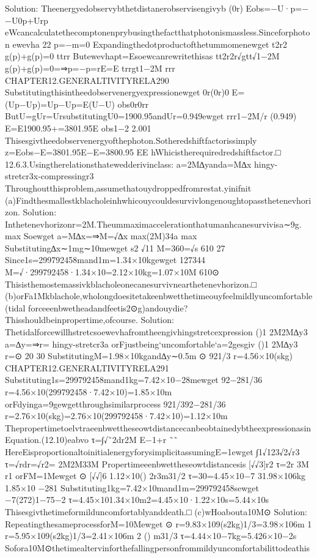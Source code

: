 {{{{{{{{{{{{{{{{Solution:
Theenergyedobservybthetdistanerobservisengivyb
(0r)
Eobs=−U·p=−−U0p+Urp
eWcancalculatethecomptonenprybusingthefactthatphotonismassless.Sinceforphoton
ewevha
22
p=−m=0
Expandingthedotproductofthetummomenewget
t2r2
g(p)+g(p)=0
ttrr
Butewevhapt=Esoewcanrewritethisas
tt2r2r√gtt√1−2M
g(p)+g(p)=0=⇒p=−p=rE=E
trrgt1−2M
rrr
CHAPTER12.GENERALTIVITYRELA290
Substitutingthisintheedobservenergyexpressionewget
0r(0r)0
E=(Up−Up)=Up−Up=E(U−U)
obs0r0rr
ButU=gUr=UrsubstitutingU0=1900.95andUr=0.949ewget
rrr1−2M/r
(0.949)
E=E1900.95+=3801.95E
obs1−2
2.001
Thisesgivtheedobservenergyofthephoton.Sotheredshiftfactorissimply
z=Eobs−E=3801.95E−E=3800.95
EE
hWhicistherequiredredshiftfactor.□
12.6.3.Usingtherelationsthatewedderivinclass:
a=2M∆yanda=M∆x
hingy-stretcr3x-compressingr3
Throughoutthisproblem,assumethatouydroppedfromrestat.yinifnit
(a)Findthesmallestkblacholeinhwhicouycouldesurvivlongenoughtopassthetenevhorizon.
Solution:
Inthetenevhorizonr=2M.Theummaximaccelerationthatumanhcanesurvivisa∼9g.
max
Soewget
a=M∆x=⇒M=√∆x
max(2M)34a
max
Substituting∆x∼1mg∼10mewget
s2
√11
M=360=√s
610
27
Since1s=299792458mand1m=1.34×10kgewget
127344
M=√·299792458·1.34×10=2.12×10kg=1.07×10M
610⊙
Thisisthemostemassivkblacholeonecanesurvivnearthetenevhorizon.□
(b)orFa1Mkblachole,wholongdoesitetakeenbwetthetimeouyfeelmildlyuncomfortable(tidal
forceeenbwetheadandfeetis2⊙g)andouydie?Thisshouldbeinpropertime,ofcourse.
Solution:
Thetidalforcewillhstretcsoewevhafromtheengivhingstretcexpression
()1
2M2M∆y3
a=∆y=⇒r=
hingy-stretcr3a
orFjustbeing‘uncomfortable‘a=2gesgiv
()1
2M∆y3
r=⊙
20
30
SubstitutingM=1.98×10kgand∆y∼0.5m
⊙
921/3
r=4.56×10(skg)
CHAPTER12.GENERALTIVITYRELA291
Substituting1s=299792458mand1kg=7.42×10−28mewget
92−281/36
r=4.56×10(299792458·7.42×10)=1.85×10m
orFdyinga=9gewgetthroughsimilarprocess
921/392−281/36
r=2.76×10(skg)=2.76×10(299792458·7.42×10)=1.12×10m
Thepropertimetoelvtraeenbwettheseowtdistancecanbeobtainedybtheexpressionasin
Equation.(12.10)eabvo
τ=∫√˜2dr2M
E−1+r
˜˜
HereEisproportionaltoinitialenergyforysimplicitassumingE=1ewget
∫1√123√2√r3
τ=√rdr=√r2=
2M2M33M
Propertimeeenbwettheseowtdistancesis
[√√3]r2
τ=2r
3M
r1
orFM=1Mewget
⊙
[√√]6
1.12×10()
2r3m31/2
τ=30=4.45×10−7
31.98×106kg
1.85×10
−281
Substituting1kg=7.42×10mand1m=299792458sewget
−7(272)1−75−2
τ=4.45×101.34×10m2=4.45×10·1.22×10s=5.44×10s
Thisesgivthetimeformilduncomfortablyanddeath.□
(c)wHoabouta10M⊙
Solution:
RepeatingthesameprocessforM=10Mewget
⊙
r=9.83×109(s2kg)1/3=3.98×106m
1
r=5.95×109(s2kg)1/3=2.41×106m
2
()
m31/3
τ=4.44×10−7kg=5.426×10−2s
Sofora10M⊙thetimealtervinforthefallingpersonfrommildyuncomfortabilittodeathis
}}}}}}}}}}}}}}}}
